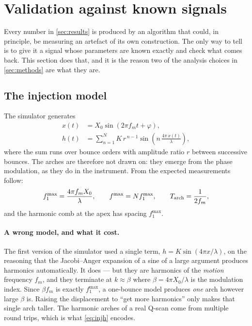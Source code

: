 ﻿\section{Validation against known signals}
\label{sec:validation}

Every number in \cref{sec:results} is produced by an algorithm that could, in
principle, be measuring an artefact of its own construction. The only way to
tell is to give it a signal whose parameters are known exactly and check what
comes back. This section does that, and it is the reason two of the analysis
choices in \cref{sec:methods} are what they are.

\subsection{The injection model}

The simulator generates
%
\begin{align}
  x(t) &= X_0 \sin(2\pi f_m t + \varphi), \label{eq:injx}\\
  h(t) &= \sum_{n=1}^{N} K\,r^{\,n-1}
          \sin\!\left(n\,\frac{4\pi\,x(t)}{\lambda}\right), \label{eq:injh}
\end{align}
%
where the sum runs over bounce orders with amplitude ratio $r$ between
successive bounces. The arches are therefore not drawn on: they emerge from
the phase modulation, as they do in the instrument. From
 the expected measurements follow:
%
\begin{equation}
  f_1^{\max} = \frac{4\pi f_m X_0}{\lambda}, \qquad
  f^{\max} = N f_1^{\max}, \qquad
  T_{\mathrm{arch}} = \frac{1}{2 f_m},
  \label{eq:injtruth}
\end{equation}
%
and the harmonic comb at the apex has spacing $f_1^{\max}$.

\paragraph{A wrong model, and what it cost.} The first version of the
simulator used a single term, $h = K \sin(4\pi x/\lambda)$, on the reasoning
that the Jacobi--Anger expansion of a sine of a large argument produces
harmonics automatically. It does --- but they are harmonics of the
\emph{motion} frequency $f_m$, and they terminate at $k \approx \beta$ where
$\beta = 4\pi X_0/\lambda$ is the modulation index. Since $\beta f_m$ is
exactly $f_1^{\max}$, a one-bounce model produces \emph{one} arch however
large $\beta$ is. Raising the displacement to ``get more harmonics'' only
makes that single arch taller. The harmonic arches of a real Q-scan come from
multiple round trips, which is what \cref{eq:injh} encodes.

